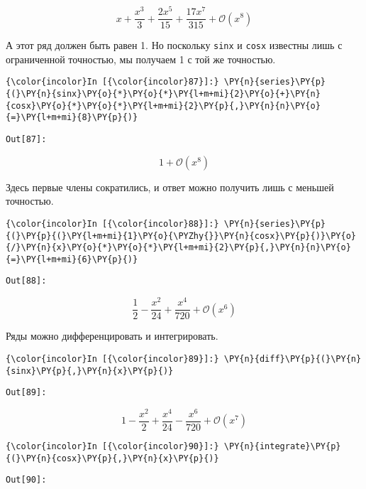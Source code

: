     \[x + \frac{x^{3}}{3} + \frac{2 x^{5}}{15} + \frac{17 x^{7}}{315} + \mathcal{O}\left(x^{8}\right)\]

    

    А этот ряд должен быть равен 1. Но поскольку \texttt{sinx} и
\texttt{cosx} известны лишь с ограниченной точностью, мы получаем 1 с
той же точностью.

    \begin{Verbatim}[commandchars=\\\{\}]
{\color{incolor}In [{\color{incolor}87}]:} \PY{n}{series}\PY{p}{(}\PY{n}{sinx}\PY{o}{*}\PY{o}{*}\PY{l+m+mi}{2}\PY{o}{+}\PY{n}{cosx}\PY{o}{*}\PY{o}{*}\PY{l+m+mi}{2}\PY{p}{,}\PY{n}{n}\PY{o}{=}\PY{l+m+mi}{8}\PY{p}{)}
\end{Verbatim}
\texttt{\color{outcolor}Out[{\color{outcolor}87}]:}
    
    \[1 + \mathcal{O}\left(x^{8}\right)\]

    

    Здесь первые члены сократились, и ответ можно получить лишь с меньшей
точностью.

    \begin{Verbatim}[commandchars=\\\{\}]
{\color{incolor}In [{\color{incolor}88}]:} \PY{n}{series}\PY{p}{(}\PY{p}{(}\PY{l+m+mi}{1}\PY{o}{\PYZhy{}}\PY{n}{cosx}\PY{p}{)}\PY{o}{/}\PY{n}{x}\PY{o}{*}\PY{o}{*}\PY{l+m+mi}{2}\PY{p}{,}\PY{n}{n}\PY{o}{=}\PY{l+m+mi}{6}\PY{p}{)}
\end{Verbatim}
\texttt{\color{outcolor}Out[{\color{outcolor}88}]:}
    
    \[\frac{1}{2} - \frac{x^{2}}{24} + \frac{x^{4}}{720} + \mathcal{O}\left(x^{6}\right)\]

    

    Ряды можно дифференцировать и интегрировать.

    \begin{Verbatim}[commandchars=\\\{\}]
{\color{incolor}In [{\color{incolor}89}]:} \PY{n}{diff}\PY{p}{(}\PY{n}{sinx}\PY{p}{,}\PY{n}{x}\PY{p}{)}
\end{Verbatim}
\texttt{\color{outcolor}Out[{\color{outcolor}89}]:}
    
    \[1 - \frac{x^{2}}{2} + \frac{x^{4}}{24} - \frac{x^{6}}{720} + \mathcal{O}\left(x^{7}\right)\]

    

    \begin{Verbatim}[commandchars=\\\{\}]
{\color{incolor}In [{\color{incolor}90}]:} \PY{n}{integrate}\PY{p}{(}\PY{n}{cosx}\PY{p}{,}\PY{n}{x}\PY{p}{)}
\end{Verbatim}
\texttt{\color{outcolor}Out[{\color{outcolor}90}]:}
    
